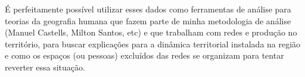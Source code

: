 É perfeitamente possível utilizar esses dados como ferramentas de análise para teorias da geografia humana que fazem parte de minha metodologia de análise (Manuel Castells, Milton Santos, etc) e que trabalham com redes e produção no território, para buscar explicações para a dinâmica territorial instalada na região e como os espaços (ou pessoas) excluídos das redes se organizam para tentar reverter essa situação.

